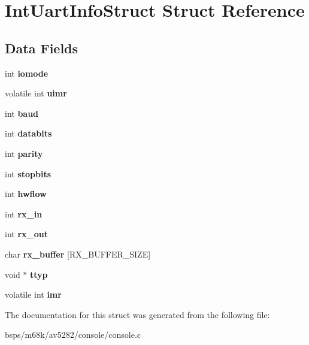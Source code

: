 \hypertarget{structIntUartInfoStruct}{}\section{Int\+Uart\+Info\+Struct Struct Reference}
\label{structIntUartInfoStruct}
\subsection*{Data Fields}
\begin{DoxyCompactItemize}
\item 
\mbox{\label{structIntUartInfoStruct_aa51e6bf85a54077beaf43554ce773ad1}} 
int {\bfseries iomode}
\item 
\mbox{\label{structIntUartInfoStruct_a438a22049dc2a49c119617c367a837a3}} 
volatile int {\bfseries uimr}
\item 
\mbox{\label{structIntUartInfoStruct_a05699d4099d0b86afdeb8b67f0467881}} 
int {\bfseries baud}
\item 
\mbox{\label{structIntUartInfoStruct_a34e9ba5d5c947acfcc346cb6fdd16af0}} 
int {\bfseries databits}
\item 
\mbox{\label{structIntUartInfoStruct_ad33bcd9d178a2693af792abd6789ced5}} 
int {\bfseries parity}
\item 
\mbox{\label{structIntUartInfoStruct_af4c452b0e5482c7b06e837ec0a1c5b6d}} 
int {\bfseries stopbits}
\item 
\mbox{\label{structIntUartInfoStruct_a7a6adcc430a66d437bab7556580a2604}} 
int {\bfseries hwflow}
\item 
\mbox{\label{structIntUartInfoStruct_a863d255d289b1d8c6e5ce60df223443d}} 
int {\bfseries rx\+\_\+in}
\item 
\mbox{\label{structIntUartInfoStruct_ae4814dffdcdb3006c66930b80f30d656}} 
int {\bfseries rx\+\_\+out}
\item 
\mbox{\label{structIntUartInfoStruct_a7c41eb75b48465ae3aa268c2e95aeb7e}} 
char {\bfseries rx\+\_\+buffer} \mbox{[}R\+X\+\_\+\+B\+U\+F\+F\+E\+R\+\_\+\+S\+I\+ZE\mbox{]}
\item 
\mbox{\label{structIntUartInfoStruct_a3533d6d64ef3f02a3b9b91dfc7f93c5f}} 
void $\ast$ {\bfseries ttyp}
\item 
\mbox{\label{structIntUartInfoStruct_a7490013dd95de759612e1eac6c9046e9}} 
volatile int {\bfseries imr}
\end{DoxyCompactItemize}


The documentation for this struct was generated from the following file\+:\begin{DoxyCompactItemize}
\item 
bsps/m68k/av5282/console/console.\+c\end{DoxyCompactItemize}
